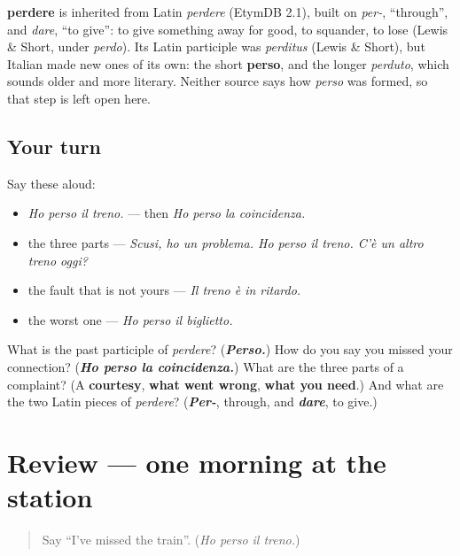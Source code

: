 \begin{cousinweb}
\textbf{perdere} is inherited from Latin \emph{perdere} (EtymDB 2.1), built on \emph{per-}, \textquotedblleft{}through\textquotedblright{}, and \emph{dare}, \textquotedblleft{}to give\textquotedblright{}: to give something away for good, to squander, to lose (Lewis \& Short, under \emph{perdo}). Its Latin participle was \emph{perditus} (Lewis \& Short), but Italian made new ones of its own: the short \textbf{perso}, and the longer \emph{perduto}, which sounds older and more literary. Neither source says how \emph{perso} was formed, so that step is left open here.
\end{cousinweb}

\subsection*{Your turn}
Say these aloud:

\begin{itemize}
\raggedright
  \item \emph{Ho perso il treno.} — then \emph{Ho perso la coincidenza.}
  \item the three parts — \emph{Scusi, ho un problema. Ho perso il treno. C'è un altro treno oggi?}
  \item the fault that is not yours — \emph{Il treno è in ritardo.}
  \item the worst one — \emph{Ho perso il biglietto.}
\end{itemize}

\begin{tcolorbox}[breakable,colback=teal!4,colframe=teal!35!black,title={Before you move on}]
What is the past participle of \emph{perdere}? (\emph{\textbf{Perso.}}) How do you say you missed your connection? (\emph{\textbf{Ho perso la coincidenza.}}) What are the three parts of a complaint? (A \textbf{courtesy}, \textbf{what went wrong}, \textbf{what you need}.) And what are the two Latin pieces of \emph{perdere}? (\emph{\textbf{Per-}}, through, and \emph{\textbf{dare}}, to give.)
\end{tcolorbox}
\section[(review)]{Review — one morning at the station}

\label{lesson:IT-C268-ripasso-stazione}



\begin{quote}
Say \textquotedblleft{}I've missed the train\textquotedblright{}. (\emph{Ho perso il treno.})
\end{quote}

